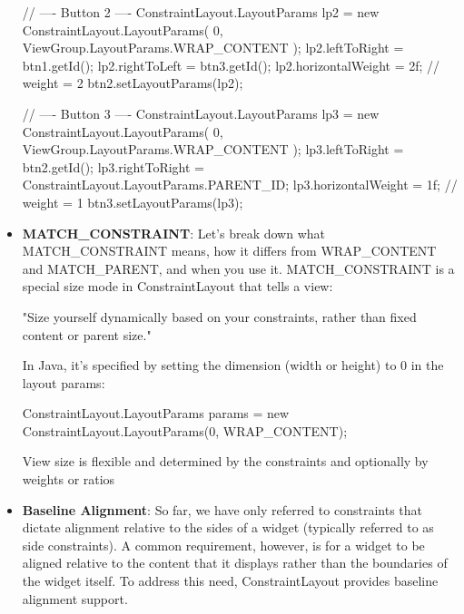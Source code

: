 \documentclass{report}
\begin{document}
\begin{itemize}
\begin{javacode}
                // ---- Button 2 ----
                ConstraintLayout.LayoutParams lp2 = new ConstraintLayout.LayoutParams(
                        0,
                        ViewGroup.LayoutParams.WRAP_CONTENT
                );
                lp2.leftToRight = btn1.getId();
                lp2.rightToLeft = btn3.getId();
                lp2.horizontalWeight = 2f; // weight = 2
                btn2.setLayoutParams(lp2);

                // ---- Button 3 ----
                ConstraintLayout.LayoutParams lp3 = new ConstraintLayout.LayoutParams(
                        0,
                        ViewGroup.LayoutParams.WRAP_CONTENT
                );
                lp3.leftToRight = btn2.getId();
                lp3.rightToRight = ConstraintLayout.LayoutParams.PARENT_ID;
                lp3.horizontalWeight = 1f; // weight = 1
                btn3.setLayoutParams(lp3);
            \end{javacode}
        \item \textbf{MATCH\_CONSTRAINT}: Let’s break down what MATCH\_CONSTRAINT means, how it differs from WRAP\_CONTENT and MATCH\_PARENT, and when you use it.
            \bigbreak \noindent 
            MATCH\_CONSTRAINT is a special size mode in ConstraintLayout that tells a view:
            \bigbreak \noindent 
            \begin{center}
                "Size yourself dynamically based on your constraints, rather than fixed content or parent size."
            \end{center}
            \bigbreak \noindent 
            In Java, it’s specified by setting the dimension (width or height) to 0 in the layout params:
            \bigbreak \noindent 
            \begin{javacode}
                ConstraintLayout.LayoutParams params = new ConstraintLayout.LayoutParams(0, WRAP_CONTENT);
            \end{javacode}
            \bigbreak \noindent 
            View size is flexible and determined by the constraints and optionally by weights or ratios
        \item \textbf{Baseline Alignment}: So far,  we have only  referred to constraints that dictate alignment relative to the sides of a widget (typically referred to as side constraints).
            \bigbreak \noindent 
            A common requirement, however, is for a widget to be aligned relative to the content that it displays rather than the boundaries of the widget itself. To address this need, ConstraintLayout provides baseline alignment support.

\end{itemize}
\end{document}
